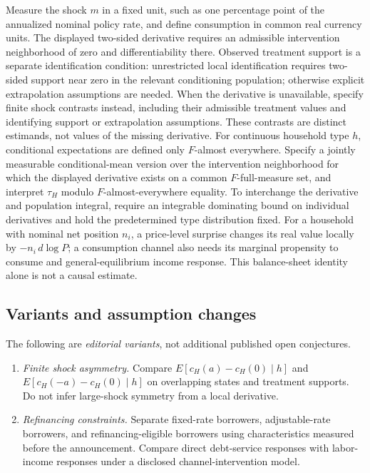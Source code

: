 \documentclass[11pt,a4paper]{article}
\begin{document}
Measure the shock \(m\) in a fixed unit, such as one percentage point of the annualized nominal policy rate, and define consumption in common real currency units. The displayed two-sided derivative requires an admissible intervention neighborhood of zero and differentiability there. Observed treatment support is a separate identification condition: unrestricted local identification requires two-sided support near zero in the relevant conditioning population; otherwise explicit extrapolation assumptions are needed. When the derivative is unavailable, specify finite shock contrasts instead, including their admissible treatment values and identifying support or extrapolation assumptions. These contrasts are distinct estimands, not values of the missing derivative. For continuous household type \(h\), conditional expectations are defined only \(F\)-almost everywhere. Specify a jointly measurable conditional-mean version over the intervention neighborhood for which the displayed derivative exists on a common \(F\)-full-measure set, and interpret \(\tau_H\) modulo \(F\)-almost-everywhere equality. To interchange the derivative and population integral, require an integrable dominating bound on individual derivatives and hold the predetermined type distribution fixed. For a household with nominal net position \(n_i\), a price-level surprise changes its real value locally by \(-n_i\,d\log P\); a consumption channel also needs its marginal propensity to consume and general-equilibrium income response. This balance-sheet identity alone is not a causal estimate.
\subsection*{Variants and assumption changes}
The following are \emph{editorial variants}, not additional published open conjectures.
\begin{enumerate}
\item \emph{Finite shock asymmetry.} Compare \(E[c_H(a)-c_H(0)\mid h]\) and \(E[c_H(-a)-c_H(0)\mid h]\) on overlapping states and treatment supports. Do not infer large-shock symmetry from a local derivative.
\item \emph{Refinancing constraints.} Separate fixed-rate borrowers, adjustable-rate borrowers, and refinancing-eligible borrowers using characteristics measured before the announcement. Compare direct debt-service responses with labor-income responses under a disclosed channel-intervention model.
\end{enumerate}
\end{document}
